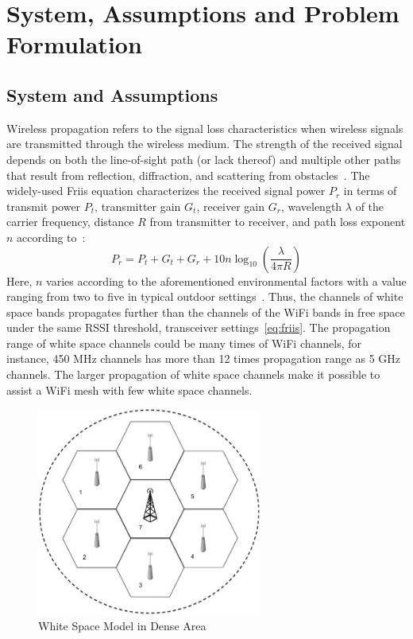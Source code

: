 \section{System, Assumptions and Problem Formulation}
\label{sec:problemformulation}

\subsection{System and Assumptions}
\label{subsec:model}

Wireless propagation refers to the signal loss characteristics when wireless signals 
are transmitted through the wireless medium. The strength of the received signal depends on 
both the line-of-sight path (or lack thereof) and multiple other paths that result from reflection, 
diffraction, and scattering from obstacles~\cite{andersen1995propagation}. The widely-used Friis
equation characterizes the received signal power $P_r$ in terms of transmit power $P_t$, transmitter 
gain $G_t$, receiver gain $G_r$, wavelength $\lambda$ of the carrier frequency, distance $R$ from 
transmitter to receiver, and path loss exponent $n$ according to~\cite{friis}:
\begin{equation}
\label{eq:friis}
P_r=P_t+G_t+G_r+10n \log_{10}\left( \frac{\lambda}{4\pi R}\right)
\end{equation}
Here, $n$ varies according to the aforementioned environmental 
factors with a value ranging from two to five in typical outdoor 
settings~\cite{rappaport}.
Thus, the channels of white space bands propagates further than the channels of the WiFi bands in 
free space under the same RSSI threshold, transceiver settings~\ref{eq:friis}. 
The propagation range of white space channels could be many times of WiFi channels, for instance, 
450 MHz channels has more than 12 times propagation range as 5 GHz channels. The larger propagation 
of white space channels make it possible to assist a WiFi mesh with few white space channels. 


\begin{figure}
\vspace{-0.0in}
\centering
\includegraphics[width=74mm]{figures/whitecell}
\vspace{-0.1in}
\caption{White Space Model in Dense Area}
\label{fig:systemmodel}
\vspace{-0.1in}
\end{figure}


